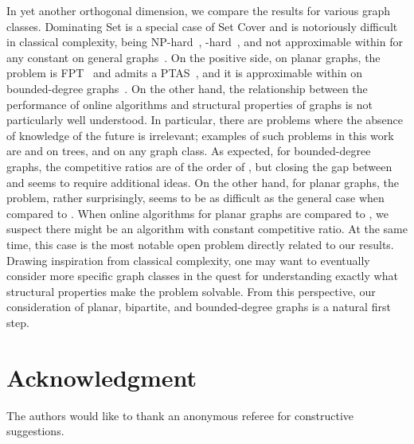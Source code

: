In yet another orthogonal dimension, we compare the results for 
various graph classes.
Dominating Set is a special case of Set Cover and is notoriously 
difficult in classical complexity,
being NP-hard~\cite{K72}, -hard~\cite{DF95}, and not
approximable within  for any constant 
on general graphs~\cite{F98}.
On the positive side, on planar graphs, the problem is FPT~\cite{ABFKN02}
and admits a PTAS~\cite{B94}, 
and it is approximable within 
on bounded-degree graphs~\cite{CH79}.
On the other hand, the relationship between
the performance of online algorithms
and structural properties of graphs
is not particularly well understood.
In particular, there are problems where
the absence of knowledge of the future is irrelevant; examples of such problems
in this work are \cds and \tds on trees, and \ids on any graph class.
As expected, for bounded-degree graphs, the competitive ratios 
are of the order of ,
but closing the gap between  and 
seems to require additional ideas.
On the other hand, for planar graphs, the problem, rather surprisingly, 
seems to be as difficult as the general case when compared to \offopt. 
When online algorithms for planar graphs
are compared to \onopt, we suspect there might be
an algorithm with constant competitive ratio.
At the same time, this case is the most notable open problem directly related 
to our results. Drawing inspiration from classical complexity,
one may want to eventually consider more specific graph classes in the 
quest for understanding exactly what structural properties
make the problem solvable.
From this perspective, our consideration of planar, bipartite, and
bounded-degree graphs is a natural first step. 

\section*{Acknowledgment}
The authors would like to thank an anonymous referee for
constructive suggestions.





